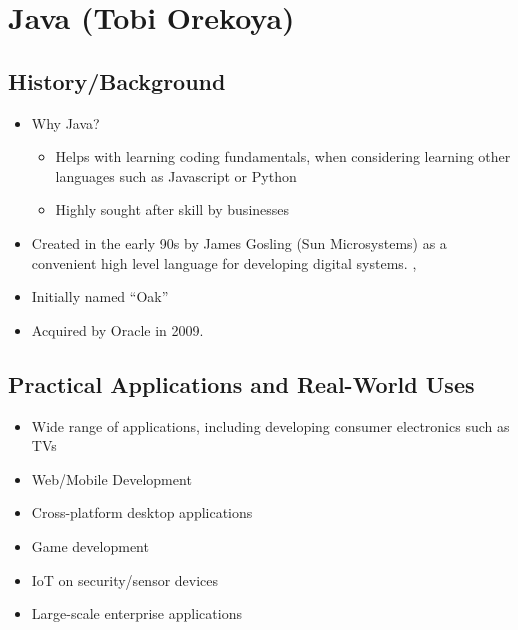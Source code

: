 \section{Java (Tobi Orekoya)}

\subsection{History/Background}
\begin{itemize}
	\item Why Java?
	\begin{itemize}
		\item Helps with learning coding fundamentals, when considering learning other languages such as Javascript or Python
		\item Highly sought after skill by businesses
	\end{itemize}

	\item Created in the early 90s by James Gosling (Sun Microsystems) as a convenient high level language for developing digital systems. \cite{javatpoint_history_nodate}, \cite{geeksforgeeks_complete_2023}
	 \item Initially named “Oak”
	\item Acquired by Oracle in 2009. \cite{ibm_cloud_education_jvm_2023}
	
\end{itemize}

\subsection{Practical Applications and Real-World Uses \cite{javinpaul_top_nodate}}
\begin{itemize}
	\item Wide range of applications, including developing consumer electronics such as TVs
	\item Web/Mobile Development
	\item Cross-platform desktop applications
	\item Game development
	\item IoT on security/sensor devices
	\item Large-scale enterprise applications
	
\end{itemize}

